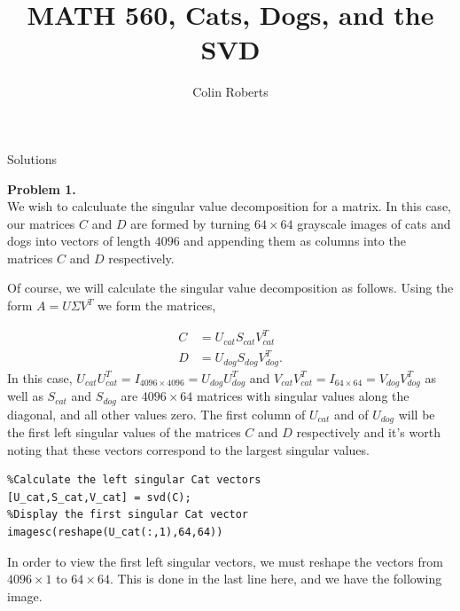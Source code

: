 \documentclass[leqno]{article}
\author{Colin Roberts}
\title{MATH 560, Cats, Dogs, and the SVD}
\theoremstyle{nonumberplain}
\begin{document}
\maketitle
\begin{large}
\begin{center}
Solutions
\end{center}
\end{large}
\pagebreak

\noindent\textbf{Problem 1.} \\

We wish to calculuate the singular value decomposition for a matrix.  In this case, our matrices $C$ and $D$ are formed by turning $64\times 64$ grayscale images of cats and dogs into vectors of length $4096$ and appending them as columns into the matrices $C$ and $D$ respectively.  

Of course, we will calculate the singular value decomposition as follows.  Using the form $A=U\Sigma V^T$ we form the matrices,

\begin{align*}
C&= U_{cat} S_{cat} V_{cat}^T\\
D&= U_{dog} S_{dog} V_{dog}^T. 
\end{align*}
In this case, $U_{cat}U_{cat}^T=I_{4096\times 4096}=U_{dog}U_{dog}^T$ and $V_{cat}V_{cat}^T=I_{64\times 64}=V_{dog}V_{dog}^T$ as well as $S_{cat}$ and $S_{dog}$ are $4096\times 64$ matrices with singular values along the diagonal, and all other values zero.  The first column of $U_{cat}$ and of $U_{dog}$ will be the first left singular values of the matrices $C$ and $D$ respectively and it's worth noting that these vectors correspond to the largest singular values.

\begin{lstlisting}
%Calculate the left singular Cat vectors
[U_cat,S_cat,V_cat] = svd(C);
%Display the first singular Cat vector
imagesc(reshape(U_cat(:,1),64,64))
\end{lstlisting}

In order to view the first left singular vectors, we must reshape the vectors from $4096\times 1$ to $64\times 64$.  This is done in the last line here, and we have the following image.
\end{document}
